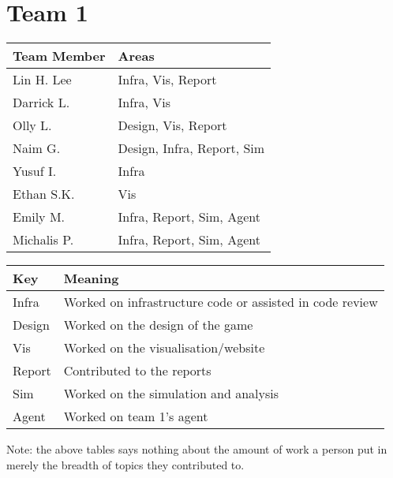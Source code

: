 \section{Team 1}
\label{sec:roles_appendix:team1}

\begin{table}[h]
    \begin{tabular}{|l|l|}
    \hline
    \textbf{Team Member} & \textbf{Areas}     \\ \hline
    Lin H. Lee  & Infra, Vis, Report         \\
    Darrick L.  & Infra, Vis                 \\
    Olly L.     & Design, Vis, Report        \\
    Naim G.     & Design, Infra, Report, Sim \\
    Yusuf I.    & Infra                      \\
    Ethan S.K.  & Vis                        \\
    Emily M.    & Infra, Report, Sim, Agent  \\
    Michalis P. & Infra, Report, Sim, Agent  \\ \hline
\end{tabular}
\end{table}

\begin{table}[h]
    \begin{tabular}{|l|l|}
    \hline
    \textbf{Key}    & \textbf{Meaning}                               \\ \hline
    Infra  & Worked on infrastructure code or assisted in code review \\
    Design & Worked on the design of the game                         \\
    Vis    & Worked on the visualisation/website                      \\
    Report & Contributed to the reports                               \\
    Sim    & Worked on the simulation and analysis                    \\
    Agent  & Worked on team 1's agent                                 \\ \hline
    \end{tabular}
    \end{table}

Note: the above tables says nothing about the amount of work a person put in merely the breadth of topics they contributed to.